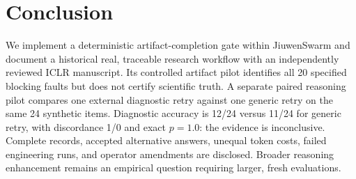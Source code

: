 \section{Conclusion}
We implement a deterministic artifact-completion gate within JiuwenSwarm and document a historical real, traceable research workflow with an independently reviewed ICLR manuscript. Its controlled artifact pilot identifies all 20 specified blocking faults but does not certify scientific truth. A separate paired reasoning pilot compares one external diagnostic retry against one generic retry on the same 24 synthetic items. Diagnostic accuracy is 12/24 versus 11/24 for generic retry, with discordance 1/0 and exact $p=1.0$: the evidence is inconclusive. Complete records, accepted alternative answers, unequal token costs, failed engineering runs, and operator amendments are disclosed. Broader reasoning enhancement remains an empirical question requiring larger, fresh evaluations.
